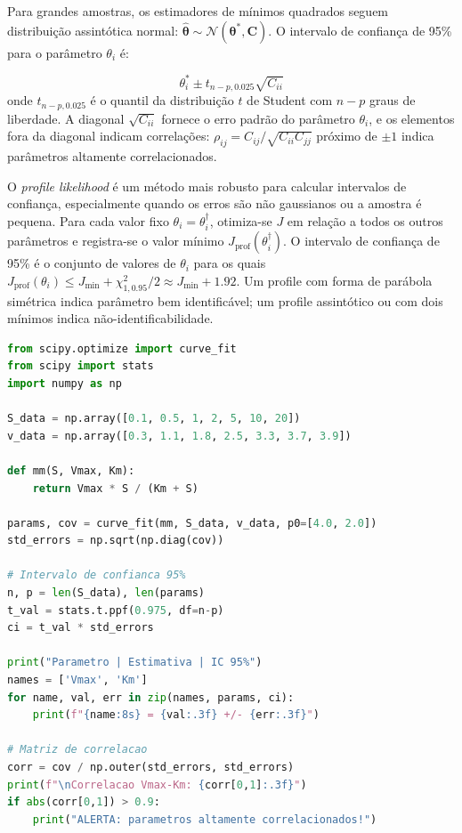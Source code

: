 Para grandes amostras, os estimadores de mínimos quadrados seguem distribuição assintótica
normal: $\hat{\boldsymbol{\theta}} \sim \mathcal{N}(\boldsymbol{\theta}^*, \mathbf{C})$.
O intervalo de confiança de 95\% para o parâmetro $\theta_i$ é:

\begin{equation}
\theta_i^* \pm t_{n-p, 0.025} \sqrt{C_{ii}}
\end{equation}
onde $t_{n-p, 0.025}$ é o quantil da distribuição $t$ de Student com $n-p$ graus de
liberdade. A diagonal $\sqrt{C_{ii}}$ fornece o erro padrão do parâmetro $\theta_i$, e os
elementos fora da diagonal indicam correlações: $\rho_{ij} = C_{ij}/\sqrt{C_{ii} C_{jj}}$
próximo de $\pm 1$ indica parâmetros altamente correlacionados.

O \emph{profile likelihood} é um método mais robusto para calcular intervalos de confiança,
especialmente quando os erros são não gaussianos ou a amostra é pequena. Para cada valor
fixo $\theta_i = \theta_i^\dagger$, otimiza-se $J$ em relação a todos os outros parâmetros
e registra-se o valor mínimo $J_\text{prof}(\theta_i^\dagger)$. O intervalo de confiança
de 95\% é o conjunto de valores de $\theta_i$ para os quais
$J_\text{prof}(\theta_i) \leq J_\text{min} + \chi^2_{1,0.95}/2 \approx J_\text{min} + 1.92$.
Um profile com forma de parábola simétrica indica parâmetro bem identificável; um profile
assintótico ou com dois mínimos indica não-identificabilidade.

\begin{lstlisting}[language=Python, caption=Calculo de intervalos de confianca e correlacao]
from scipy.optimize import curve_fit
from scipy import stats
import numpy as np

S_data = np.array([0.1, 0.5, 1, 2, 5, 10, 20])
v_data = np.array([0.3, 1.1, 1.8, 2.5, 3.3, 3.7, 3.9])

def mm(S, Vmax, Km):
    return Vmax * S / (Km + S)

params, cov = curve_fit(mm, S_data, v_data, p0=[4.0, 2.0])
std_errors = np.sqrt(np.diag(cov))

# Intervalo de confianca 95%
n, p = len(S_data), len(params)
t_val = stats.t.ppf(0.975, df=n-p)
ci = t_val * std_errors

print("Parametro | Estimativa | IC 95%")
names = ['Vmax', 'Km']
for name, val, err in zip(names, params, ci):
    print(f"{name:8s} = {val:.3f} +/- {err:.3f}")

# Matriz de correlacao
corr = cov / np.outer(std_errors, std_errors)
print(f"\nCorrelacao Vmax-Km: {corr[0,1]:.3f}")
if abs(corr[0,1]) > 0.9:
    print("ALERTA: parametros altamente correlacionados!")
\end{lstlisting}


